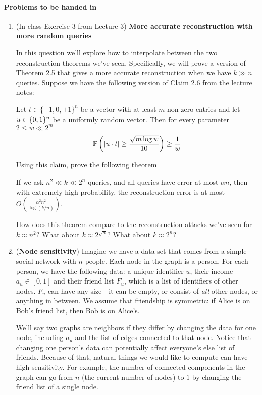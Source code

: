 \documentclass[11pt]{article}
\begin{document}
 \paragraph{Problems to be handed in}
\begin{enumerate}[leftmargin=\parindent, itemsep=3ex]

  
  

\item (In-class Exercise 3 from Lecture 3) \textbf{More accurate
    reconstruction with more random queries}

  In this question we'll explore how to interpolate between the two reconstruction theorems we've seen.  Specifically, we will prove a version of Theorem 2.5 that gives a more accurate reconstruction when we have $k \gg n$ queries.  Suppose we have the following version of Claim 2.6 from the lecture notes:
\begin{clm} 
	Let $t \in \{-1,0,+1\}^n$ be a vector with at least $m$ non-zero entries and let $u \in \{0,1\}^{n}$ be a uniformly random vector.  Then for every parameter $2 \leq w \ll  2^{m}$
	\begin{equation}
		{\operatorname*{\mathbb{P}}_{} {\left ( {| u \cdot t | \geq  \frac{\sqrt{m \log w}}{10}} \right)}} \geq \frac{1}{w}
	\end{equation}
\end{clm}
Using this claim, prove the following theorem
\begin{thm}
	If we ask $n^2 \ll k \ll 2^n$ queries, and all queries have error at most $\alpha n$, then with extremely high probability, the reconstruction error is at most $O(\frac{\alpha^2 n^2}{\log(k/n)})$.
\end{thm}

How does this theorem compare to the reconstruction attacks we've seen for $k \approx n^2$?  What about $k \approx 2^{\sqrt{n}}$?  What about $k \approx 2^n$?

\newpage
\item (\textbf{Node sensitivity}) Imagine we have a data set
  that comes from a simple social network with $n$ people. Each node in the graph is a
  person. For each person, we have the following data: a unique
  identifier $u$, their income $a_{u} \in [0,1]$
  and their friend list $F_{u}$, which is a list of identifiers
  of other nodes. $F_{u}$ can have any size---it can be empty, or
  consist of \emph{all} other nodes, or anything in between. We
  assume that friendship is symmetric: if Alice is on Bob's friend
  list, then Bob is on Alice's.

  We'll say two graphs are neighbors if they differ by changing the
  data for one node, including $a_{u}$ and the list of edges connected
  to that node. Notice that changing one person's data can potentially
  affect everyone's else list of friends.
  Because of that, natural things
  we would like to compute can have high sensitivity. For example, the
  number of connected components in the graph can go from $n$ (the
  current number of nodes) to $1$
  by changing the friend list of  a single node. 
  

\end{enumerate}
\end{document}
